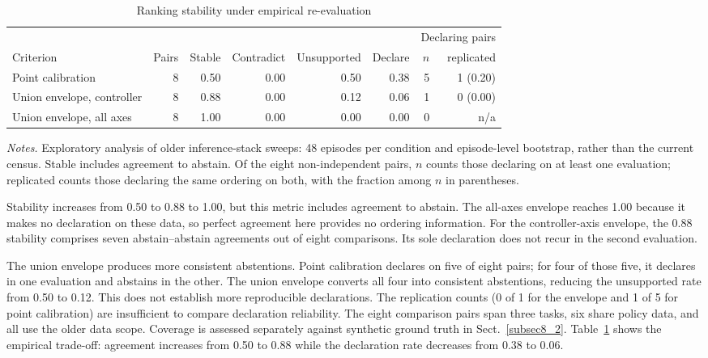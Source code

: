 \documentclass[pdflatex,iicol,sn-apa]{sn-jnl}
\theoremstyle{remark}
\newcommand{\tablenote}[1]{\par\vspace{4pt}\noindent
\begin{minipage}{\linewidth}\tablefootnotefont\raggedright #1\par\end{minipage}}
\begin{document}
\begin{table}[t]
\caption{Ranking stability under empirical re-evaluation}\label{tab8}
\begin{tabular}{@{}lrrrrrrr@{}}
\toprule
 & & & & & & \multicolumn{2}{c}{Declaring pairs} \\
\cmidrule(l){7-8}
Criterion & Pairs & Stable & Contradict & Unsupported & Declare & $n$ & replicated \\
\midrule
Point calibration & 8 & 0.50 & 0.00 & 0.50 & 0.38 & 5 & 1 (0.20) \\
Union envelope, controller & 8 & 0.88 & 0.00 & 0.12 & 0.06 & 1 & 0 (0.00) \\
Union envelope, all axes & 8 & 1.00 & 0.00 & 0.00 & 0.00 & 0 & n/a \\
\bottomrule
\end{tabular}
\tablenote{\textit{Notes.} Exploratory analysis of older inference-stack sweeps: 48 episodes per condition and episode-level bootstrap, rather than the current census. Stable includes agreement to abstain. Of the eight non-independent pairs, $n$ counts those declaring on at least one evaluation; replicated counts those declaring the same ordering on both, with the fraction among $n$ in parentheses.}
\end{table}

Stability increases from 0.50 to 0.88 to 1.00, but this metric includes agreement to abstain.
The all-axes envelope reaches 1.00 because it makes no declaration on these data, so perfect
agreement here provides no ordering information. For the controller-axis envelope, the 0.88
stability comprises seven abstain--abstain agreements out of eight comparisons. Its sole
declaration does not recur in the second evaluation.

The union envelope produces more consistent abstentions. Point calibration declares on five
of eight pairs; for four of those five, it declares in one evaluation and abstains in the other.
The union envelope converts all four into consistent abstentions, reducing the unsupported rate
from 0.50 to 0.12. This does not establish more reproducible declarations. The replication counts
(0 of 1 for the envelope and 1 of 5 for point calibration) are insufficient to compare declaration
reliability. The eight comparison pairs span three tasks, six share policy data, and all use the
older data scope. Coverage is assessed separately against synthetic ground truth in
Sect.~\ref{subsec8_2}. Table~\ref{tab8} shows the empirical trade-off: agreement increases
from 0.50 to 0.88 while the declaration rate decreases from 0.38 to 0.06.
\end{document}
